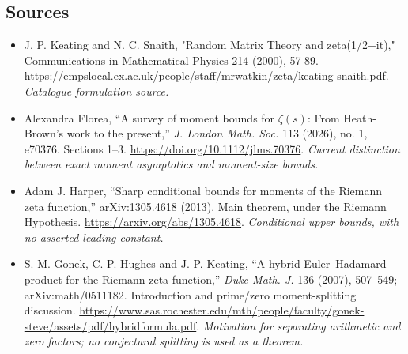 \documentclass[11pt,a4paper]{article}
\numberwithin{equation}{section}
\begin{document}
\subsection{Sources}
\begin{itemize}\raggedright
\item[\textnormal{[S1]}]\hypertarget{source:30006978:1}{} J. P. Keating and N. C. Snaith, "Random Matrix Theory and zeta(1/2+it)," Communications in Mathematical Physics 214 (2000), 57-89.
\url{https://empslocal.ex.ac.uk/people/staff/mrwatkin/zeta/keating-snaith.pdf}.
{\small\textit{Catalogue formulation source.}}
\item[\textnormal{[E1]}]\hypertarget{extra:30006978:1}{} Alexandra Florea, ``A survey of moment bounds for $\zeta(s)$: From Heath-Brown's work to the present,'' \emph{J. London Math. Soc.} 113 (2026), no. 1, e70376. Sections 1--3.
\url{https://doi.org/10.1112/jlms.70376}.
{\small\textit{Current distinction between exact moment asymptotics and moment-size bounds.}}
\item[\textnormal{[E2]}]\hypertarget{extra:30006978:2}{} Adam J. Harper, ``Sharp conditional bounds for moments of the Riemann zeta function,'' arXiv:1305.4618 (2013). Main theorem, under the Riemann Hypothesis.
\url{https://arxiv.org/abs/1305.4618}.
{\small\textit{Conditional upper bounds, with no asserted leading constant.}}
\item[\textnormal{[E3]}]\hypertarget{extra:30006978:3}{} S. M. Gonek, C. P. Hughes and J. P. Keating, ``A hybrid Euler--Hadamard product for the Riemann zeta function,'' \emph{Duke Math. J.} 136 (2007), 507--549; arXiv:math/0511182. Introduction and prime/zero moment-splitting discussion.
\url{https://www.sas.rochester.edu/mth/people/faculty/gonek-steve/assets/pdf/hybridformula.pdf}.
{\small\textit{Motivation for separating arithmetic and zero factors; no conjectural splitting is used as a theorem.}}
\end{itemize}
\end{document}
